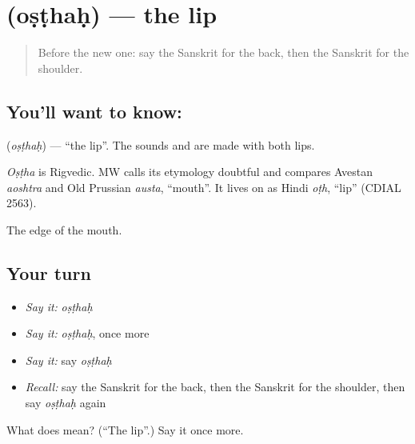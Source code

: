 \section[\texorpdfstring{\sk{ओष्ठः} (oṣṭhaḥ)}{ओष्ठः (oṣṭhaḥ)}]{ (oṣṭhaḥ) — the lip}

\label{lesson:SA-C70-lip}



\begin{quote}
Before the new one: say the Sanskrit for the back, then the Sanskrit for the shoulder.
\end{quote}

\subsection*{You'll want to know: }
\textbf{} (\emph{oṣṭhaḥ}) — \textquotedblleft{}the lip\textquotedblright{}. The sounds \textbf{} and \textbf{} are made with both lips.

\begin{cousinweb}
\emph{Oṣṭha} is Rigvedic. MW calls its etymology doubtful and compares Avestan \emph{aoshtra} and Old Prussian \emph{austa}, \textquotedblleft{}mouth\textquotedblright{}. It lives on as Hindi \emph{oṭh}, \textquotedblleft{}lip\textquotedblright{} (CDIAL 2563).
\end{cousinweb}

\begin{grammarlens}[title={What you've built}]
The edge of the mouth.
\end{grammarlens}

\subsection*{Your turn}
\begin{itemize}
\raggedright
  \item \emph{Say it:} \emph{oṣṭhaḥ}
  \item \emph{Say it:} \emph{oṣṭhaḥ}, once more
  \item \emph{Say it:} say \emph{oṣṭhaḥ}
  \item \emph{Recall:} say the Sanskrit for the back, then the Sanskrit for the shoulder, then say \emph{oṣṭhaḥ} again
\end{itemize}

\begin{tcolorbox}[breakable,colback=teal!4,colframe=teal!35!black,title={Before you move on}]
What does  mean? (\textquotedblleft{}The lip\textquotedblright{}.) Say it once more.
\end{tcolorbox}
